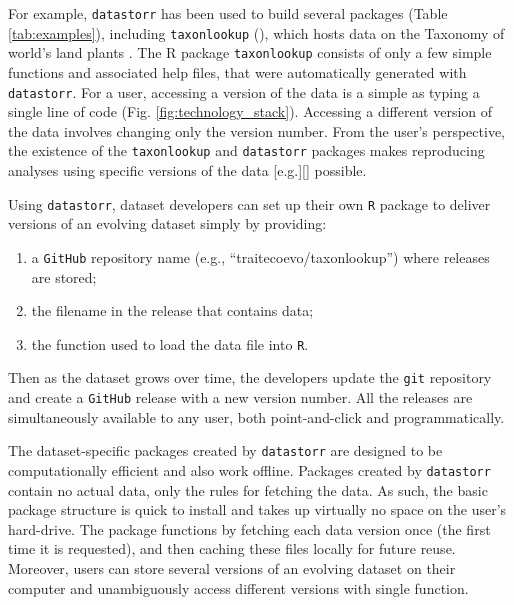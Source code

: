 \documentclass[a4paper,num-refs]{assets/oup-contemporary}
\begin{document}
For example, \texttt{datastorr} has been used to build several packages (Table \ref{tab:examples}), including \texttt{taxonlookup} (), which hosts data on the Taxonomy of world's land plants \cite{Pennell-2015a}. The R package \texttt{taxonlookup} consists of only a few simple functions and associated help files, that were automatically generated with \texttt{datastorr}. For a user, accessing a version of the data is a simple as typing a single line of code (Fig. \ref{fig:technology_stack}). Accessing a different version of the data involves changing only the version number. From the user's perspective, the existence of the \texttt{taxonlookup} and \texttt{datastorr} packages makes reproducing analyses using specific versions of the data [e.g.][]\cite{Pennell-2015a, Mounce2018} possible.

Using \texttt{datastorr}, dataset developers can set up their own \texttt{R} package to deliver versions of an evolving dataset simply by providing:
\begin{enumerate}
  \item a \texttt{GitHub} repository name (e.g., ``traitecoevo/taxonlookup'') where releases are stored;
  \item the filename in the release that contains data;
  \item the function used to load the data file into \texttt{R}.
\end{enumerate}

Then as the dataset grows over time, the developers update the \texttt{git} repository and create a \texttt{GitHub} release with a new version number. All the releases are simultaneously available to any user, both point-and-click and programmatically.

The dataset-specific packages created by \texttt{datastorr} are designed to be computationally efficient and also work offline. Packages created by \texttt{datastorr} contain no actual data, only the rules for fetching the data. As such, the basic package structure is quick to install and takes up virtually no space on the user's hard-drive. The package functions by fetching each data version once (the first time it is requested), and then caching these files locally for future reuse. Moreover, users can store several versions of an evolving dataset on their computer and unambiguously access different versions with single function.
\end{document}
